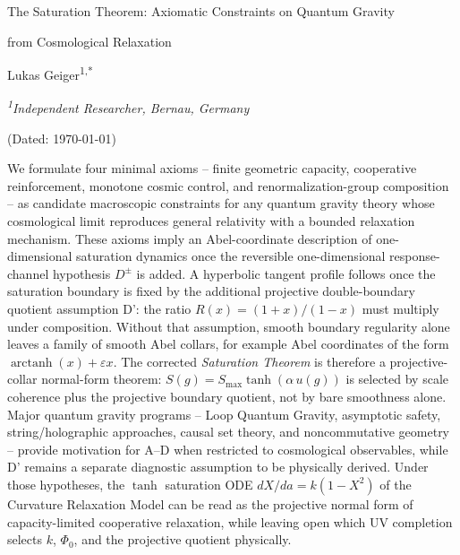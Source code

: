 \documentclass[aps,prd,twocolumn,superscriptaddress,nofootinbib]{revtex4-2}
\begin{document}
\onecolumngrid


\thispagestyle{empty}
\vspace*{0.08\textheight}

\begin{center}
{\LARGE The Saturation Theorem: Axiomatic Constraints on Quantum Gravity\par}
\vspace{0.2em}
{\LARGE from Cosmological Relaxation\par}
\vspace{1.8em}
{\large Lukas Geiger\textsuperscript{1,*}\par}
\vspace{0.6em}
{\itshape \textsuperscript{1}Independent Researcher, Bernau, Germany\textsuperscript{\textdagger}\par}
\vspace{0.2em}
{(Dated: \today)\par}
\end{center}

\vspace{1.8em}
\noindent
We formulate four minimal axioms -- finite geometric capacity, cooperative reinforcement, monotone cosmic control, and renormalization-group composition -- as candidate macroscopic constraints for any quantum gravity theory whose cosmological limit reproduces general relativity with a bounded relaxation mechanism. These axioms imply an Abel-coordinate description of one-dimensional saturation dynamics once the reversible one-dimensional response-channel hypothesis $D^\pm$ is added. A hyperbolic tangent profile follows once the saturation boundary is fixed by the additional projective double-boundary quotient assumption D': the ratio $R(x)=(1+x)/(1-x)$ must multiply under composition. Without that assumption, smooth boundary regularity alone leaves a family of smooth Abel collars, for example Abel coordinates of the form $\operatorname{arctanh}(x)+\varepsilon x$. The corrected \textit{Saturation Theorem} is therefore a projective-collar normal-form theorem: $S(g)=S_{\max}\tanh(\alpha\,u(g))$ is selected by scale coherence plus the projective boundary quotient, not by bare smoothness alone. Major quantum gravity programs -- Loop Quantum Gravity, asymptotic safety, string/holographic approaches, causal set theory, and noncommutative geometry -- provide motivation for A--D when restricted to cosmological observables, while D' remains a separate diagnostic assumption to be physically derived. Under those hypotheses, the $\tanh$ saturation ODE $dX/da = k(1-X^2)$ of the Curvature Relaxation Model can be read as the projective normal form of capacity-limited cooperative relaxation, while leaving open which UV completion selects $k$, $\Phi_0$, and the projective quotient physically.
\end{document}
